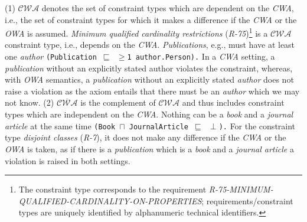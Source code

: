 \documentclass{acm_proc_article-sp}
\newcommand{\ms}[1]{%
  \texttt{#1}
}
\begin{document}
(1) $\mathcal{CWA}$ denotes the set of constraint types which are dependent on the \emph{CWA},
	i.e., the set of constraint types for which it makes a difference if the \emph{CWA} or the \emph{OWA} is assumed.
{\em Minimum qualified cardinality restrictions} (\emph{R-75})\footnote{The constraint type corresponds to the requirement \emph{R-75-MINIMUM-QUALIFIED-CARDINALITY-ON-PROPERTIES}; requirements/constraint types are uniquely identified by alphanumeric technical identifiers.} is a $\mathcal{CWA}$ constraint type, i.e., depends on the \emph{CWA}.
\emph{Publications}, e.g., must have at least one \emph{author} {\small\ms{(Publication $\sqsubseteq$ $\geq$1 author.Person).}}
In a \emph{CWA} setting, a \emph{publication} without an explicitly stated author violates the constraint, 
whereas, with \emph{OWA} semantics, 
a \emph{publication} without an explicitly stated \emph{author} does not raise a violation 
as the axiom entails that there must be an \emph{author} which we may not know.
(2) $\overline{\mathcal{CWA}}$ is the complement of $\mathcal{CWA}$ and thus includes constraint types which are independent on the \emph{CWA}.
Nothing can be a \emph{book} and a \emph{journal article}  at the same time {\small\ms{(Book $\sqcap$ JournalArticle $\sqsubseteq$ $\perp$).}}
For the constraint type {\em disjoint classes} (\emph{R-7}), it does not make any difference if the \emph{CWA} or the \emph{OWA} is taken,
as if there is a \emph{publication} which is a \emph{book} and a \emph{journal article} a violation is raised in both settings.

\end{document}
